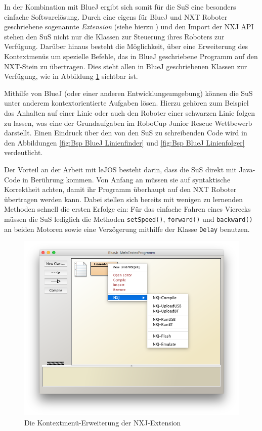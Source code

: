 \documentclass[paper=a4, DIV=calc, BCOR=12mm, twoside=on, onecolumn=on, open = right, titlepage =on, parskip =half-, headsepline = on, footsepline = off, chapterprefix = off, appendixprefix = on, fontsize = 12pt, numbers = noenddot, abstract = on]{scrbook}
\begin{document}
In der Kombination mit BlueJ ergibt sich somit für die SuS eine besonders einfache Softwarelösung. Durch eine eigens für BlueJ und NXT Roboter geschriebene sogenannte \textit{Extension} (siehe hierzu \cite{bowes:12}) und den Import der NXJ API stehen den SuS nicht nur die Klassen zur Steuerung ihres Roboters zur Verfügung. Darüber hinaus besteht die Möglichkeit, über eine Erweiterung des Kontextmenüs um spezielle Befehle, das in BlueJ geschriebene Programm auf den NXT-Stein zu übertragen. Dies steht allen in BlueJ geschriebenen Klassen zur Verfügung, wie in Abbildung \ref{fig:extension} sichtbar ist.


Mithilfe von BlueJ (oder einer anderen Entwicklungsumgebung) können die SuS unter anderem kontextorientierte Aufgaben lösen. Hierzu gehören zum Beispiel das Anhalten auf einer Linie oder auch den Roboter einer schwarzen Linie folgen zu lassen, was eine der Grundaufgaben im RoboCup Junior Rescue Wettbewerb darstellt. Einen Eindruck über den von den SuS zu schreibenden Code wird in den Abbildungen \ref{fig:Bsp BlueJ Linienfinder} und \ref{fig:Bsp BlueJ Linienfolger} verdeutlicht.



Der Vorteil an der Arbeit mit leJOS besteht darin, dass die SuS direkt mit Java-Code in Berührung kommen. Von Anfang an müssen sie auf syntaktische Korrektheit achten, damit ihr Programm überhaupt auf den NXT Roboter übertragen werden kann. Dabei stellen sich bereits mit wenigen zu lernenden Methoden schnell die ersten Erfolge ein: Für das einfache Fahren eines Vierecks müssen die SuS lediglich die  Methoden \texttt{setSpeed()}, \texttt{forward()} und \texttt{backward()} an beiden Motoren sowie eine Verzögerung mithilfe der Klasse \texttt{Delay} benutzen. 

\begin{figure}[htb]
\centering
\includegraphics[width=\textwidth]{images/extension.png}
\caption{Die Kontextmenü-Erweiterung der NXJ-Extension}
\label{fig:extension}
\end{figure}
\end{document}
